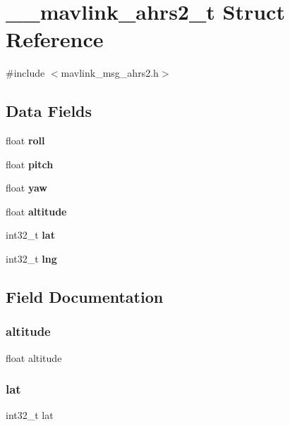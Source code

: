 \section{\+\_\+\+\_\+mavlink\+\_\+ahrs2\+\_\+t Struct Reference}
\label{struct____mavlink__ahrs2__t}


{\ttfamily \#include $<$mavlink\+\_\+msg\+\_\+ahrs2.\+h$>$}

\subsection*{Data Fields}
\begin{DoxyCompactItemize}
\item 
float \textbf{ roll}
\item 
float \textbf{ pitch}
\item 
float \textbf{ yaw}
\item 
float \textbf{ altitude}
\item 
int32\+\_\+t \textbf{ lat}
\item 
int32\+\_\+t \textbf{ lng}
\end{DoxyCompactItemize}


\subsection{Field Documentation}
\mbox{\label{struct____mavlink__ahrs2__t_a0e13a4b4ae0cefdac2a413284239caa6}} 
\subsubsection{altitude}
{\footnotesize\ttfamily float altitude}

\mbox{\label{struct____mavlink__ahrs2__t_a58d1cfb46a8035aadcb0d2b3f178e1ed}} 
\subsubsection{lat}
{\footnotesize\ttfamily int32\+\_\+t lat}

\mbox{\label{struct____mavlink__ahrs2__t_a821ea8a67976a7186afd96e810b51315}} 
